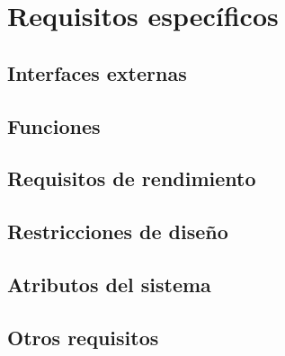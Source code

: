 \chapter{Requisitos específicos}

\section{Interfaces externas}

\section{Funciones}

\section{Requisitos de rendimiento}

\section{Restricciones de diseño}

\section{Atributos del sistema}

\section{Otros requisitos}